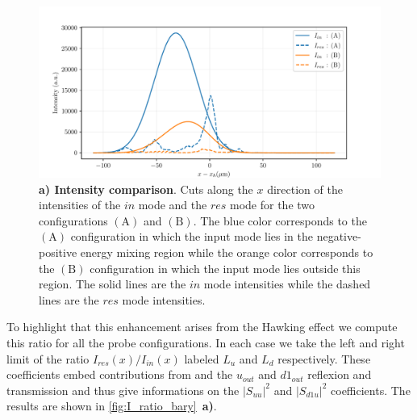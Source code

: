 \begin{figure}
    \centering
    \includegraphics[width=1\textwidth]{chap_stimulated_hawking/fig/intensity_comparison.pdf}
    \caption{\textbf{a) Intensity comparison}. Cuts along the $x$ direction of the intensities of the $in$ mode and the $res$ mode for the two configurations $\mathrm{(A)}$ and $\mathrm{(B)}$.
    The blue color corresponds to the $\mathrm{(A)}$ configuration in which the input mode lies in the negative-positive energy mixing region while the orange color corresponds to the $\mathrm{(B)}$ configuration in which the input mode lies outside this region.
    The solid lines are the $in$ mode intensities while the dashed lines are the $res$ mode intensities.}
    \label{fig:intensity_comparison}
\end{figure}

To highlight that this enhancement arises from the Hawking effect we compute this ratio for all the probe configurations. In each case we take the left and right limit of the ratio $I_{res}(x)/I_{in}(x)$  labeled $L_u$ and $L_d$ respectively.
These coefficients embed contributions from and the $u_{out}$ and $d1_{out}$ reflexion and transmission and thus give informations on the $|S_{uu}|^2$ and $|S_{d1u}|^2$ coefficients.
The results are shown in \autoref{fig:I_ratio_bary}~\textbf{a)}. 

